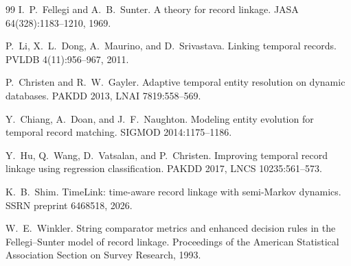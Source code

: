 \documentclass[11pt]{article}
\begin{document}
\begin{thebibliography}{99}
I.~P.~Fellegi and A.~B.~Sunter. A theory for record linkage.
\newblock JASA 64(328):1183--1210, 1969.

P.~Li, X.~L.~Dong, A.~Maurino, and D.~Srivastava. Linking temporal records.
\newblock PVLDB 4(11):956--967, 2011.

P.~Christen and R.~W.~Gayler. Adaptive temporal entity resolution on dynamic databases.
\newblock PAKDD 2013, LNAI 7819:558--569.

Y.~Chiang, A.~Doan, and J.~F.~Naughton. Modeling entity evolution for temporal record
matching. \newblock SIGMOD 2014:1175--1186.

Y.~Hu, Q.~Wang, D.~Vatsalan, and P.~Christen. Improving temporal record linkage using
regression classification. \newblock PAKDD 2017, LNCS 10235:561--573.

K.~B.~Shim. TimeLink: time-aware record linkage with semi-Markov dynamics.
\newblock SSRN preprint 6468518, 2026.

W.~E.~Winkler. String comparator metrics and enhanced decision rules in the
Fellegi--Sunter model of record linkage.
\newblock Proceedings of the American Statistical Association Section on Survey
Research, 1993.
\end{thebibliography}
\end{document}
